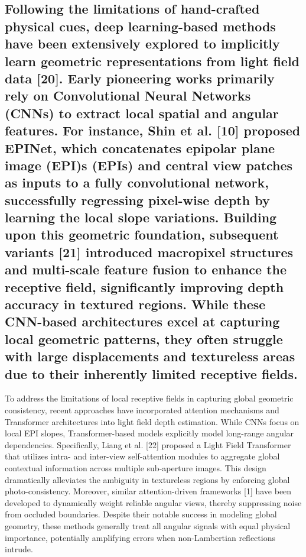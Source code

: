 \subsection{Following the limitations of hand-crafted physical cues, deep learning-based methods have been extensively explored to implicitly learn geometric representations from light field data [20]. Early pioneering works primarily rely on Convolutional Neural Networks (CNNs) to extract local spatial and angular features. For instance, Shin et al. [10] proposed EPINet, which concatenates epipolar plane image (EPI)s (EPIs) and central view patches as inputs to a fully convolutional network, successfully regressing pixel-wise depth by learning the local slope variations. Building upon this geometric foundation, subsequent variants [21] introduced macropixel structures and multi-scale feature fusion to enhance the receptive field, significantly improving depth accuracy in textured regions. While these CNN-based architectures excel at capturing local geometric patterns, they often struggle with large displacements and textureless areas due to their inherently limited receptive fields.}

To address the limitations of local receptive fields in capturing global geometric consistency, recent approaches have incorporated attention mechanisms and Transformer architectures into light field depth estimation. While CNNs focus on local EPI slopes, Transformer-based models explicitly model long-range angular dependencies. Specifically, Liang et al. [22] proposed a Light Field Transformer that utilizes intra- and inter-view self-attention modules to aggregate global contextual information across multiple sub-aperture images. This design dramatically alleviates the ambiguity in textureless regions by enforcing global photo-consistency. Moreover, similar attention-driven frameworks [1] have been developed to dynamically weight reliable angular views, thereby suppressing noise from occluded boundaries. Despite their notable success in modeling global geometry, these methods generally treat all angular signals with equal physical importance, potentially amplifying errors when non-Lambertian reflections intrude.